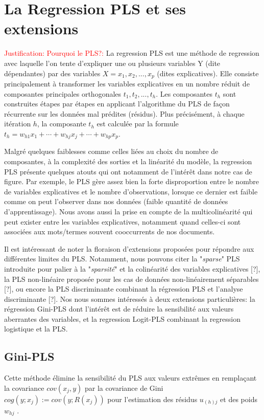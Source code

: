 \section{La Regression PLS et ses extensions}
\label{sec:sensresultat:pls}
\textcolor{red}{Justification: Pourquoi le PLS?:}
La regression PLS est une méthode de regression avec laquelle l'on tente d'expliquer une ou plusieurs variables Y (dite dépendantes) par des variables $X=x_1,x_2,...,x_p$ (dites explicatives). Elle consiste principalement à transformer les variables explicatives en un nombre réduit de composantes principales orthogonales $t_1, t_2, ..., t_h$. Les composantes $t_h$ sont construites étapes par étapes en applicant l'algorithme du PLS de façon récurrente sur les données mal prédites (résidus). Plus précisément, à chaque itération $h$, la composante $t_h$ est calculée par la formule $t_h = w_{h1} x_1 + \cdots + w_{hj} x_j + \cdots + w_{hp} x_p$. 

Malgré quelques faiblesses comme celles liées au choix du nombre de composantes, à la complexité des sorties et la linéarité du modèle, la regression PLS présente quelques atouts qui ont notamment de l'intérêt dans notre cas de figure. Par exemple, le PLS gère assez bien la forte disproportion entre le nombre de variables explicatives et le nombre d'observations, lorsque ce dernier est faible comme on peut l'observer dans nos données (faible quantité de données d'apprentissage). Nous avons aussi la prise en compte de la multicolinéarité qui peut exister entre les variables explicatives, notamment quand celles-ci sont associées aux mots/termes souvent cooccurrents de nos documents.

Il est intéressant de noter la floraison d'extensions proposées pour répondre aux différentes limites du PLS. Notamment, nous pouvons citer la "\textit{sparse}" PLS introduite pour palier à la "\textit{sparsité}" et la colinéarité des variables explicatives [?], la PLS non-linéaire proposée pour les cas de données non-linéairement séparables [?], ou encore la PLS discriminante combinant la régression PLS et l'analyse discriminante [?]. Nos nous sommes intéressés à deux extensions particulières: la régression Gini-PLS \citep{mussard2018ginipls} dont l'intérêt est de réduire la sensibilité aux valeurs aberrantes des variables, et la regression Logit-PLS \citep{tenenhaus2005logitpls}  combinant la regression logistique et la PLS.
\subsection{Gini-PLS}
Cette méthode élimine la sensibilité du PLS aux valeurs extrêmes en remplaçant la covariance $cov(x_j, y)$ par la covariance de Gini $cog(y; x_j) := cov(y; R(x_j))$ pour l'estimation des résidus $u_{(h)j}$ et des poids $w_{hj}$ \citep{mussard2018ginipls}.



